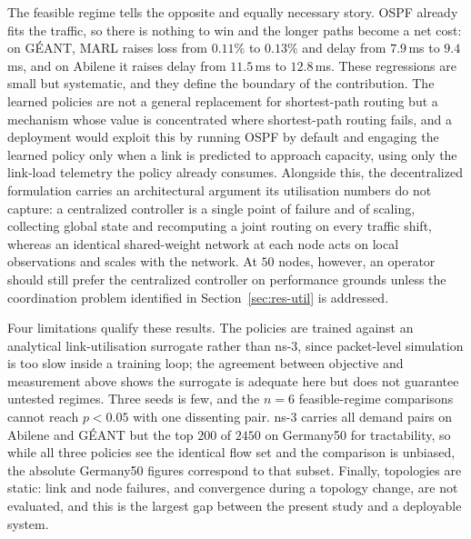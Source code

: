 The feasible regime tells the opposite and equally necessary story. OSPF already
fits the traffic, so there is nothing to win and the longer paths become a net
cost: on GÉANT, MARL raises loss from $0.11\%$ to $0.13\%$ and delay from
$7.9$\,ms to $9.4$\,ms, and on Abilene it raises delay from $11.5$\,ms to
$12.8$\,ms. These regressions are small but systematic, and they define the
boundary of the contribution. The learned policies are not a general replacement
for shortest-path routing but a mechanism whose value is concentrated where
shortest-path routing fails, and a deployment would exploit this by running OSPF
by default and engaging the learned policy only when a link is predicted to
approach capacity, using only the link-load telemetry the policy already
consumes. Alongside this, the decentralized formulation carries an architectural
argument its utilisation numbers do not capture: a centralized controller is a
single point of failure and of scaling, collecting global state and recomputing
a joint routing on every traffic shift, whereas an identical shared-weight
network at each node acts on local observations and scales with the network. At
$50$ nodes, however, an operator should still prefer the centralized controller
on performance grounds unless the coordination problem identified in
Section~\ref{sec:res-util} is addressed.

Four limitations qualify these results. The policies are trained against an
analytical link-utilisation surrogate rather than ns-3, since packet-level
simulation is too slow inside a training loop; the agreement between objective
and measurement above shows the surrogate is adequate here but does not
guarantee untested regimes. Three seeds is few, and the $n=6$ feasible-regime
comparisons cannot reach $p<0.05$ with one dissenting pair. ns-3 carries all
demand pairs on Abilene and GÉANT but the top $200$ of $2450$ on Germany50 for
tractability, so while all three policies see the identical flow set and the
comparison is unbiased, the absolute Germany50 figures correspond to that
subset. Finally, topologies are static: link and node failures, and convergence
during a topology change, are not evaluated, and this is the largest gap between
the present study and a deployable system.
